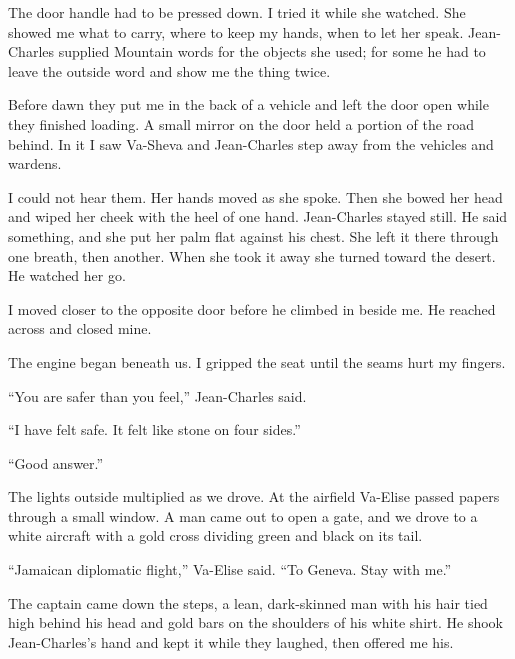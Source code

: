 The door handle had to be pressed down. I tried it while she watched. She showed me what to carry, where to keep my hands, when to let her speak. Jean-Charles supplied Mountain words for the objects she used; for some he had to leave the outside word and show me the thing twice.\par

Before dawn they put me in the back of a vehicle and left the door open while they finished loading. A small mirror on the door held a portion of the road behind. In it I saw Va-Sheva and Jean-Charles step away from the vehicles and wardens.\par

I could not hear them. Her hands moved as she spoke. Then she bowed her head and wiped her cheek with the heel of one hand. Jean-Charles stayed still. He said something, and she put her palm flat against his chest. She left it there through one breath, then another. When she took it away she turned toward the desert. He watched her go.\par

I moved closer to the opposite door before he climbed in beside me. He reached across and closed mine.\par

The engine began beneath us. I gripped the seat until the seams hurt my fingers.\par

``You are safer than you feel,'' Jean-Charles said.\par

``I have felt safe. It felt like stone on four sides.''\par

``Good answer.''\par

The lights outside multiplied as we drove. At the airfield Va-Elise passed papers through a small window. A man came out to open a gate, and we drove to a white aircraft with a gold cross dividing green and black on its tail.\par

``Jamaican diplomatic flight,'' Va-Elise said. ``To Geneva. Stay with me.''\par

The captain came down the steps, a lean, dark-skinned man with his hair tied high behind his head and gold bars on the shoulders of his white shirt. He shook Jean-Charles's hand and kept it while they laughed, then offered me his.\par


